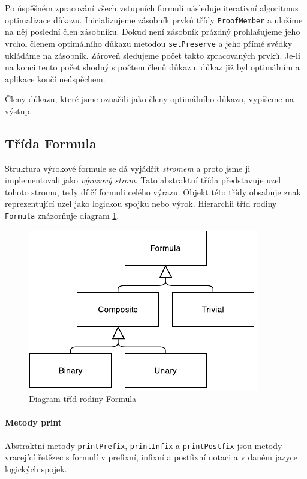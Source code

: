 \documentclass[thesis=B,czech,hidelinks]{thesis}[2012/06/26]
\begin{document}
Po úspěšném zpracování všech vstupních formulí následuje iterativní algoritmus optimalizace důkazu. Inicializujeme zásobník prvků třídy \texttt{ProofMember} a uložíme na něj poslední člen zásobníku. Dokud není zásobník prázdný prohlašujeme jeho vrchol členem optimálního důkazu metodou \texttt{setPreserve} a jeho přímé svědky ukládáme na zásobník. Zároveň sledujeme počet takto zpracovaných prvků. Je-li na konci tento počet shodný s počtem členů důkazu, důkaz již byl optimálním a aplikace končí neúspěchem.

Členy důkazu, které jsme označili jako členy optimálního důkazu, vypíšeme na výstup.

\subsection{Třída Formula}

Struktura výrokové formule se dá vyjádřit \emph{stromem} a proto jsme ji implementovali jako \emph{výrazový strom}. Tato abstraktní třída představuje uzel tohoto stromu, tedy dílčí formuli celého výrazu. Objekt této třídy obsahuje znak reprezentující uzel jako logickou spojku nebo výrok. Hierarchii tříd rodiny \texttt{Formula} znázorňuje diagram \ref{fig:formula}.

\begin{figure}
\centering
\caption{Diagram tříd rodiny Formula}
\label{fig:formula}
\includegraphics{diagrams/formula}
\end{figure}

\paragraph{Metody print}

Abstraktní metody \texttt{printPrefix}, \texttt{printInfix} a \texttt{printPostfix} jsou metody vracející řetězec s formulí v prefixní, infixní a postfixní notaci a v daném jazyce logických spojek.
\end{document}
